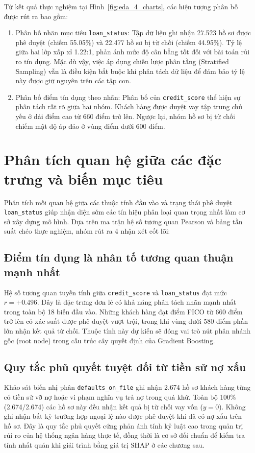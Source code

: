 \documentclass[12pt,a4paper,oneside]{report}
\begin{document}
Từ kết quả thực nghiệm tại Hình~\ref{fig:eda_4_charts}, các hiện tượng phân bố được rút ra bao gồm:
\begin{enumerate}
    \item Phân bố nhãn mục tiêu \texttt{loan\_status}: Tập dữ liệu ghi nhận 27.523 hồ sơ được phê duyệt (chiếm 55.05\%) và 22.477 hồ sơ bị từ chối (chiếm 44.95\%). Tỷ lệ giữa hai lớp xấp xỉ 1.22:1, phản ánh mức độ cân bằng tốt đối với bài toán rủi ro tín dụng. Mặc dù vậy, việc áp dụng chiến lược phân tầng (Stratified Sampling) vẫn là điều kiện bắt buộc khi phân tách dữ liệu để đảm bảo tỷ lệ này được giữ nguyên trên các tập con.
    \item Phân bố điểm tín dụng theo nhãn: Phân bố của \texttt{credit\_score} thể hiện sự phân tách rất rõ giữa hai nhóm. Khách hàng được duyệt vay tập trung chủ yếu ở dải điểm cao từ 660 điểm trở lên. Ngược lại, nhóm hồ sơ bị từ chối chiếm mật độ áp đảo ở vùng điểm dưới 600 điểm.
\end{enumerate}

\section{Phân tích quan hệ giữa các đặc trưng và biến mục tiêu}

Phân tích mối quan hệ giữa các thuộc tính đầu vào và trạng thái phê duyệt \texttt{loan\_status} giúp nhận diện sớm các tín hiệu phân loại quan trọng nhất làm cơ sở xây dựng mô hình. Dựa trên ma trận hệ số tương quan Pearson và bảng tần suất chéo thực nghiệm, nhóm rút ra 4 nhận xét cốt lõi:

\subsection{Điểm tín dụng là nhân tố tương quan thuận mạnh nhất}
Hệ số tương quan tuyến tính giữa \texttt{credit\_score} và \texttt{loan\_status} đạt mức $r = +0.496$. Đây là đặc trưng đơn lẻ có khả năng phân tách nhãn mạnh nhất trong toàn bộ 18 biến đầu vào. Những khách hàng đạt điểm FICO từ 660 điểm trở lên có xác suất được phê duyệt vượt trội, trong khi vùng dưới 580 điểm phần lớn nhận kết quả từ chối. Thuộc tính này dự kiến sẽ đóng vai trò nút phân nhánh gốc (root node) trong cấu trúc cây quyết định của Gradient Boosting.

\subsection{Quy tắc phủ quyết tuyệt đối từ tiền sử nợ xấu}
Khảo sát biến nhị phân \texttt{defaults\_on\_file} ghi nhận 2.674 hồ sơ khách hàng từng có tiền sử vỡ nợ hoặc vi phạm nghĩa vụ trả nợ trong quá khứ. Toàn bộ 100\% (2.674/2.674) các hồ sơ này đều nhận kết quả bị từ chối vay vốn ($y = 0$). Không ghi nhận bất kỳ trường hợp ngoại lệ nào được phê duyệt khi đã có nợ xấu trên hồ sơ. Đây là quy tắc phủ quyết cứng phản ánh tính kỷ luật cao trong quản trị rủi ro của hệ thống ngân hàng thực tế, đồng thời là cơ sở đối chuẩn để kiểm tra tính nhất quán khi giải trình bằng giá trị SHAP ở các chương sau.
\end{document}
